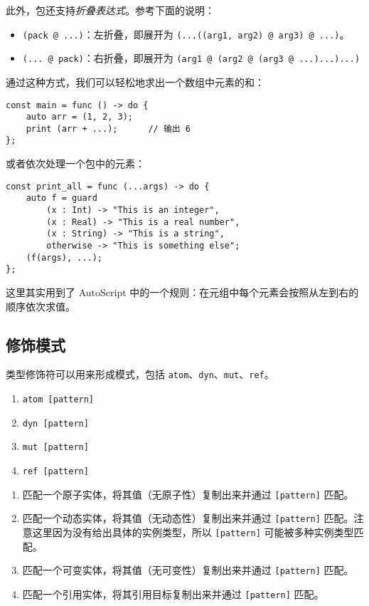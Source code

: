 此外，包还支持\emph{折叠表达式}。参考下面的说明：

\begin{itemize}
	\item \lstinline!(pack @ ...)!：左折叠，即展开为 \lstinline!(...((arg1, arg2) @ arg3) @ ...)!。
	\item \lstinline!(... @ pack)!：右折叠，即展开为 \lstinline!(arg1 @ (arg2 @ (arg3 @ ...)...)...)!
\end{itemize}

通过这种方式，我们可以轻松地求出一个数组中元素的和：

\begin{lstlisting}
const main = func () -> do {
	auto arr = (1, 2, 3);
	print (arr + ...);		// 输出 6
};
\end{lstlisting}

或者依次处理一个包中的元素：

\begin{lstlisting}
const print_all = func (...args) -> do {
	auto f = guard
		(x : Int) -> "This is an integer",
		(x : Real) -> "This is a real number",
		(x : String) -> "This is a string",
		otherwise -> "This is something else";
	(f(args), ...);
};
\end{lstlisting}

这里其实用到了 AutoScript 中的一个规则：在元组中每个元素会按照从左到右的顺序依次求值。

\subsection{修饰模式}

类型修饰符可以用来形成模式，包括 \lstinline!atom!、\lstinline!dyn!、\lstinline!mut!、\lstinline!ref!。

\begin{grammar} \label{grm:qualifier-pattern}
\begin{enumerate}
    \item \lstinline!atom [pattern]!
    \item \lstinline!dyn [pattern]!
    \item \lstinline!mut [pattern]!
    \item \lstinline!ref [pattern]!
\end{enumerate}
\end{grammar}

\begin{enumerate}
    \item 匹配一个原子实体，将其值（无原子性）复制出来并通过 \lstinline![pattern]! 匹配。
    \item 匹配一个动态实体，将其值（无动态性）复制出来并通过 \lstinline![pattern]! 匹配。注意这里因为没有给出具体的实例类型，所以 \lstinline![pattern]! 可能被多种实例类型匹配。
    \item 匹配一个可变实体，将其值（无可变性）复制出来并通过 \lstinline![pattern]! 匹配。
    \item 匹配一个引用实体，将其引用目标复制出来并通过 \lstinline![pattern]! 匹配。
\end{enumerate}

